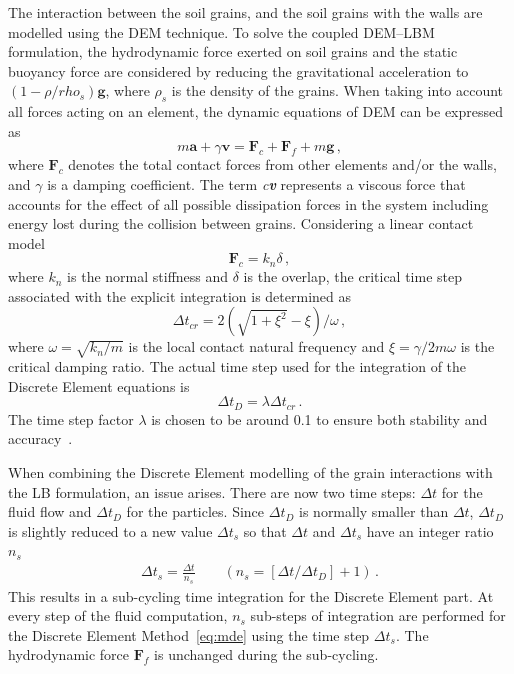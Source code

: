The interaction between the soil grains, and the soil grains with the walls are 
modelled using the DEM technique. To solve the coupled DEM--LBM formulation, 
the hydrodynamic force exerted on soil grains and the static buoyancy force are 
considered by reducing the gravitational acceleration to $(1- 
\rho/rho_{s})\mathbf{g}$, where $\rho_{s}$ is the density of the grains. When 
taking into account all forces acting on an element, the dynamic equations of 
DEM can be expressed as
%
\begin{equation}
\label{eq:mde}
\mathit{m}\mathbf{a} +\gamma\mathbf{v} = \mathbf{F}_{c} + \mathbf{F}_{f} 
+\mathit{m}\mathbf{g} \,,
\end{equation} 
%
\noindent where $\mathbf{F}_{c}$ denotes the total contact forces from other 
elements and/or the walls, and $\gamma$ is a damping coefficient. The term 
\textit{c\textbf{v}} represents a viscous force that accounts for the effect of 
all possible dissipation forces in the system including energy lost during the 
collision between grains. Considering a linear contact model
%
\begin{equation}
\mathbf{F}_{c}=\mathit{k}_{\mathit{n}} \delta \,,
\end{equation}
%
\noindent where $\mathit{k}_{\mathit{n}}$ is the normal stiffness and $\delta$ 
is the overlap, the critical time step associated with the explicit integration 
is determined as~\citep{He1997}
%
\begin{equation}
\Delta t_{\mathit{cr}}= 2(\sqrt{1 + \xi^{2}}-\xi) / \omega \,,
\end{equation}
%
\noindent where $\omega = \sqrt{\mathit{k}_{\mathit{n}}/\mathit{m}}$ is the 
local contact natural frequency and $\xi = \gamma/2\mathit{m}\omega$ is the 
critical damping ratio. The actual time step used for the integration of the 
Discrete Element equations is
%
\begin{equation}
\Delta \mathit{t}_{D}=\lambda \Delta \mathit{t}_{cr} \,.
\end{equation}
%
The time step factor $\lambda$ is chosen to be around 0.1 to ensure both 
stability and accuracy~\citep{He1997}.

When combining the Discrete Element modelling of the grain interactions with 
the LB formulation, an issue arises. There are now two time steps: $\Delta t$ 
for the fluid flow and $\Delta t_{D}$ for the particles. Since $\Delta t_{D}$ 
is normally smaller than $\Delta t$, $\Delta t_{D}$ is slightly reduced to a 
new value $\Delta t_{s}$ so that $\Delta t$ and $\Delta t_{s}$ have an integer 
ratio $\mathit{n}_{\mathit{s}}$
%
\begin{align}
\Delta t_{s}=\frac{\Delta t}{\mathit{n}_{s}} \qquad(\mathit{n}_{s}=[\Delta t/ 
\Delta t_{D}]+1) \,.
\end{align} 
%
This results in a sub-cycling time integration for the Discrete 
Element part. At every step of the fluid computation, $\mathit{n}_{s}$ 
sub-steps of integration are performed for the Discrete Element 
Method~\eqref{eq:mde} using the time step $\Delta t_{s}$. The hydrodynamic 
force $\mathbf{F}_{f}$ is unchanged during the sub-cycling. 

